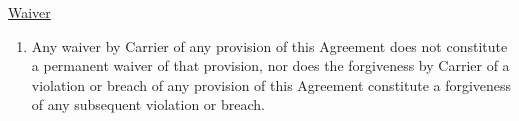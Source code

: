 \underline{Waiver}
\begin{enumerate}[
    ref = \SecondLevelEnumerator
]
    \item Any waiver by Carrier of any provision of this Agreement does not
    constitute a permanent waiver of that provision, nor does the
    forgiveness by Carrier of a violation or breach of any provision of
    this Agreement constitute a forgiveness of any subsequent violation or
    breach.
\end{enumerate}